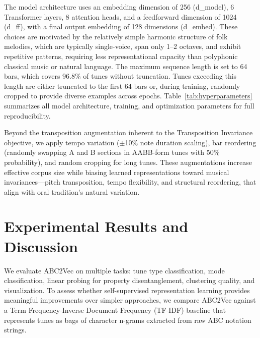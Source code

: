 \documentclass[]{interact}
\theoremstyle{plain}
\theoremstyle{definition}
\theoremstyle{remark}
\begin{document}
The model architecture uses an embedding dimension of 256 (d\_model), 6 Transformer layers, 8 attention heads, and a feedforward dimension of 1024 (d\_ff), with a final output embedding of 128 dimensions (d\_embed). These choices are motivated by the relatively simple harmonic structure of folk melodies, which are typically single-voice, span only 1--2 octaves, and exhibit repetitive patterns, requiring less representational capacity than polyphonic classical music or natural language. The maximum sequence length is set to 64 bars, which covers 96.8\% of tunes without truncation. Tunes exceeding this length are either truncated to the first 64 bars or, during training, randomly cropped to provide diverse examples across epochs. Table~\ref{tab:hyperparameters} summarizes all model architecture, training, and optimization parameters for full reproducibility. 

Beyond the transposition augmentation inherent to the Transposition Invariance objective, we apply tempo variation ($\pm$10\% note duration scaling), bar reordering (randomly swapping A and B sections in AABB-form tunes with 50\% probability), and random cropping for long tunes. These augmentations increase effective corpus size while biasing learned representations toward musical invariances—pitch transposition, tempo flexibility, and structural reordering, that align with oral tradition's natural variation.



\section{Experimental Results and Discussion}\label{sec:results}

We evaluate ABC2Vec on multiple tasks: tune type classification, mode classification, linear probing for property disentanglement, clustering quality, and visualization. To assess whether self-supervised representation learning provides meaningful improvements over simpler approaches, we compare ABC2Vec against a Term Frequency-Inverse Document Frequency (TF-IDF) baseline that represents tunes as bags of character n-grams extracted from raw ABC notation strings.
\end{document}
